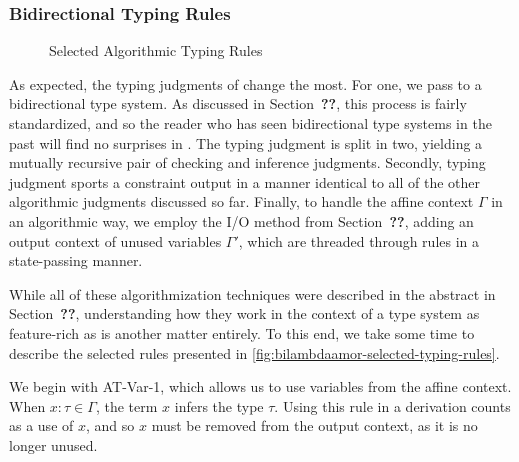 \subsubsection{Bidirectional Typing Rules}

\begin{figure}

\caption{Selected Algorithmic Typing Rules}
\label{fig:bilambdaamor-selected-typing-rules}
\end{figure}

As expected, the typing judgments of \bilambdaamor change the most. For one, we pass to a bidirectional type system. As discussed in Section~\textbf{??}, this process is fairly standardized, and so the reader who has seen bidirectional type systems in the past will find no surprises in \bilambdaamor. The typing judgment is split in two, yielding a mutually recursive pair of checking and inference judgments. Secondly, typing judgment sports a constraint output in a manner identical to all of the other algorithmic judgments discussed so far. Finally, to handle the affine context $\Gamma$ in an algorithmic way, we employ the I/O method from Section~\textbf{??}, adding an output context of unused variables $\Gamma'$, which are threaded through rules in a state-passing manner.

While all of these algorithmization techniques were described in the abstract in Section~\textbf{??}, understanding how they work in the context of a type system as feature-rich as \bilambdaamor is another matter entirely. To this end, we take some time to describe the selected rules presented in \autoref{fig:bilambdaamor-selected-typing-rules}.

We begin with AT-Var-1, which allows us to use variables from the affine context. When $x : \tau \in \Gamma$, the term $x$ infers the type $\tau$. Using this rule in a derivation counts as a use of $x$, and so $x$ must be removed from the output context, as it is no longer unused.


